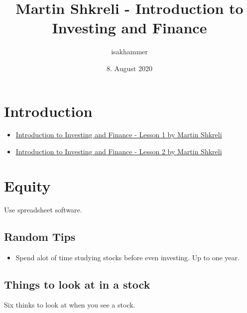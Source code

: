 \documentclass{article}
\title{Martin Shkreli -  Introduction to Investing and Finance}
\author{isakhammer }
\date{8. August 2020}
\theoremstyle{remark}
\begin{document}
\maketitle
\tableofcontents
\newpage

\newpage

\newpage
\section{Introduction}%
\label{sec:introduction}

\begin{itemize}
  \item
\href{https://www.youtube.com/watch?v=VI_riscmviI}{Introduction to Investing and Finance - Lesson 1 by Martin Shkreli }
\item 
\href{https://www.youtube.com/watch?v=DbK_3ImHl8o}{Introduction to Investing and Finance - Lesson 2 by Martin Shkreli
}
\end{itemize}

\section{Equity}%
\label{sec:equity}

Use spreadsheet software.

\subsection{Random Tips}%
\label{sub:random_tips}

\begin{itemize}
  \item  Spend alot of time studying stocks before even investing. Up to one year.
\end{itemize}

\subsection{Things to look at in a stock}%
\label{sub:things_to_look_at_in_a_stock}

Six thinks to look at when you see a stock.
\end{document}
